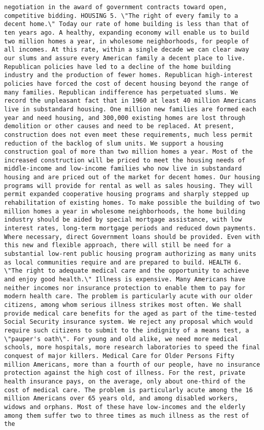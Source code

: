 \documentclass[
]{article}
\begin{document}
\begin{verbatim}
negotiation in the award of government contracts toward open, competitive bidding. HOUSING 5. \"The right of every family to a decent home.\" Today our rate of home building is less than that of ten years ago. A healthy, expanding economy will enable us to build two million homes a year, in wholesome neighborhoods, for people of all incomes. At this rate, within a single decade we can clear away our slums and assure every American family a decent place to live. Republican policies have led to a decline of the home building industry and the production of fewer homes. Republican high-interest policies have forced the cost of decent housing beyond the range of many families. Republican indifference has perpetuated slums. We record the unpleasant fact that in 1960 at least 40 million Americans live in substandard housing. One million new families are formed each year and need housing, and 300,000 existing homes are lost through demolition or other causes and need to be replaced. At present, construction does not even meet these requirements, much less permit reduction of the backlog of slum units. We support a housing construction goal of more than two million homes a year. Most of the increased construction will be priced to meet the housing needs of middle-income and low-income families who now live in substandard housing and are priced out of the market for decent homes. Our housing programs will provide for rental as well as sales housing. They will permit expanded cooperative housing programs and sharply stepped up rehabilitation of existing homes. To make possible the building of two million homes a year in wholesome neighborhoods, the home building industry should be aided by special mortgage assistance, with low interest rates, long-term mortgage periods and reduced down payments. Where necessary, direct Government loans should be provided. Even with this new and flexible approach, there will still be need for a substantial low-rent public housing program authorizing as many units as local communities require and are prepared to build. HEALTH 6. \"The right to adequate medical care and the opportunity to achieve and enjoy good health.\" Illness is expensive. Many Americans have neither incomes nor insurance protection to enable them to pay for modern health care. The problem is particularly acute with our older citizens, among whom serious illness strikes most often. We shall provide medical care benefits for the aged as part of the time-tested Social Security insurance system. We reject any proposal which would require such citizens to submit to the indignity of a means test, a \"pauper's oath\". For young and old alike, we need more medical schools, more hospitals, more research laboratories to speed the final conquest of major killers. Medical Care for Older Persons Fifty million Americans, more than a fourth of our people, have no insurance protection against the high cost of illness. For the rest, private health insurance pays, on the average, only about one-third of the cost of medical care. The problem is particularly acute among the 16 million Americans over 65 years old, and among disabled workers, widows and orphans. Most of these have low-incomes and the elderly among them suffer two to three times as much illness as the rest of the 
\end{verbatim}
\end{document}
